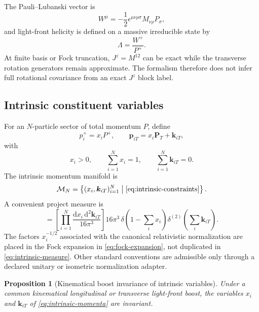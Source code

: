 \documentclass[11pt]{article}
\newtheorem{proposition}[definition]{Proposition}
\newcommand{\PT}{\bm{P}_{T}}
\newcommand{\dd}{\mathrm{d}}
\newcommand{\cM}{\mathcal M}
\begin{document}
The Pauli--Lubanski vector is
\begin{equation}
 W^\mu=-\frac12\epsilon^{\mu\nu\rho\sigma}M_{\nu\rho}P_\sigma,
\label{eq:pauli-lubanski}
\end{equation}
and light-front helicity is defined on a massive irreducible state by
\begin{equation}
 \Lambda=\frac{W^+}{P^+}.
\label{eq:lf-helicity}
\end{equation}
At finite basis or Fock truncation, \(J^z=M^{12}\) can be exact while the
transverse rotation generators remain approximate.  The formalism therefore
does not infer full rotational covariance from an exact \(J^z\) block label.

\subsection{Intrinsic constituent variables}

For an \(N\)-particle sector of total momentum \(P\), define
\begin{equation}
 p_i^+=x_iP^+,
 \qquad
 \bm p_{iT}=x_i\PT+\bm k_{iT},
\label{eq:intrinsic-momenta}
\end{equation}
with
\begin{equation}
 x_i>0,
 \qquad
 \sum_{i=1}^N x_i=1,
 \qquad
 \sum_{i=1}^N\bm k_{iT}=0.
\label{eq:intrinsic-constraints}
\end{equation}
The intrinsic momentum manifold is
\begin{equation}
 \cM_N=
 \left\{(x_i,\bm k_{iT})_{i=1}^N
 \;\middle|\;\cref{eq:intrinsic-constraints}\right\}.
\label{eq:intrinsic-manifold}
\end{equation}
A convenient project measure is
\begin{equation}
 [\dd\Gamma_N]
 =\left[\prod_{i=1}^N
 \frac{\dd x_i\,\dd^2\bm k_{iT}}{16\pi^3}\right]
 16\pi^3\,
 \delta\!\left(1-\sum_i x_i\right)
 \delta^{(2)}\!\left(\sum_i\bm k_{iT}\right).
\label{eq:intrinsic-measure}
\end{equation}
The factors \(x_i^{-1/2}\) associated with the canonical relativistic
normalization are placed in the Fock expansion in
\cref{eq:fock-expansion}, not duplicated in \cref{eq:intrinsic-measure}.
Other standard conventions are admissible only through a declared unitary or
isometric normalization adapter.

\begin{proposition}[Kinematical boost invariance of intrinsic variables]
\label{prop:intrinsic-boost}
Under a common kinematical longitudinal or transverse light-front boost, the
variables \(x_i\) and \(\bm k_{iT}\) of
\cref{eq:intrinsic-momenta} are invariant.
\end{proposition}
\end{document}
